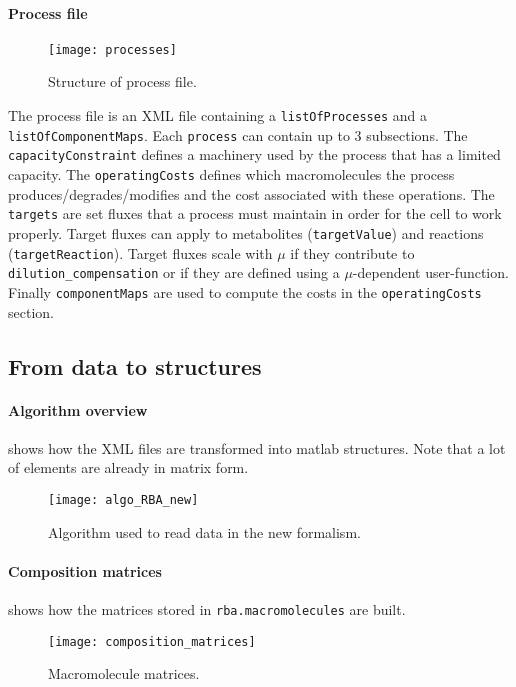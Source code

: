 \paragraph{Process file}
\begin{figure}[ht]
  \centering
  \texttt{[image: processes]}
  \caption{Structure of process file.}
  \label{fig:processes}
\end{figure}
The process file is an XML file containing a \texttt{listOfProcesses} and a \texttt{listOfComponentMaps}. Each \texttt{process} can contain up to 3 subsections. The \texttt{capacityConstraint} defines a machinery used by the process that has a limited capacity. The \texttt{operatingCosts} defines which macromolecules the process produces/degrades/modifies and the cost associated with these operations. The \texttt{targets} are set fluxes that a process must maintain in order for the cell to work properly. Target fluxes can apply to metabolites (\texttt{targetValue}) and reactions (\texttt{targetReaction}). Target fluxes scale with $\mu$ if they contribute to \texttt{dilution\_compensation} or if they are defined using a $\mu$-dependent user-function. Finally \texttt{componentMaps} are used to compute the costs in the \texttt{operatingCosts} section.

\clearpage
\subsection{From data to structures}

\paragraph{Algorithm overview}
 shows how the XML files are transformed into matlab structures. Note that a lot of elements are already in matrix form.
\begin{figure}[ht]
  \centering
  \texttt{[image: algo\_RBA\_new]}
  \caption{Algorithm used to read data in the new formalism.}
  \label{fig:algo_rba_new}
\end{figure}

\paragraph{Composition matrices}  shows how the matrices stored in \texttt{rba.macromolecules} are built.
\begin{figure}[ht]
  \centering
  \texttt{[image: composition\_matrices]}
  \caption{Macromolecule matrices.}
  \label{fig:composition_matrices}
\end{figure}


